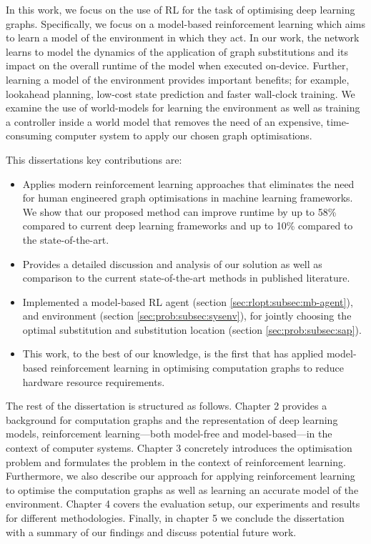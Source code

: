 In this work, we focus on the use of RL for the task of optimising deep learning graphs. Specifically, we focus on a model-based reinforcement learning which aims to learn a model of the environment in which they act. In our work, the network learns to model the dynamics of the application of graph substitutions and its impact on the overall runtime of the model when executed on-device. Further, learning a model of the environment provides important benefits; for example, lookahead planning, low-cost state prediction and faster wall-clock training. We examine the use of world-models for learning the environment as well as training a controller inside a world model that removes the need of an expensive, time-consuming computer system to apply our chosen graph optimisations.

This dissertations key contributions are:

\begin{itemize}
  \item Applies modern reinforcement learning approaches that eliminates the need for human engineered graph optimisations in machine learning frameworks. We show that our proposed method can improve runtime by up to 58\% compared to current deep learning frameworks and up to 10\% compared to the state-of-the-art.
  \item Provides a detailed discussion and analysis of our solution as well as comparison to the current state-of-the-art methods in published literature.
  \item Implemented a model-based RL agent (section \ref{sec:rlopt:subsec:mb-agent}), and environment (section \ref{sec:prob:subsec:sysenv}), for jointly choosing the optimal substitution and substitution location (section \ref{sec:prob:subsec:sap}).
  \item This work, to the best of our knowledge, is the first that has applied model-based reinforcement learning in optimising computation graphs to reduce hardware resource requirements.
\end{itemize}

The rest of the dissertation is structured as follows. Chapter 2 provides a background for computation graphs and the representation of deep learning models, reinforcement learning---both model-free and model-based---in the context of computer systems. Chapter 3 concretely introduces the optimisation problem and formulates the problem in the context of reinforcement learning. Furthermore, we also describe our approach for applying reinforcement learning to optimise the computation graphs as well as learning an accurate model of the environment. Chapter 4 covers the evaluation setup, our experiments and results for different methodologies. Finally, in chapter 5 we conclude the dissertation with a summary of our findings and discuss potential future work.